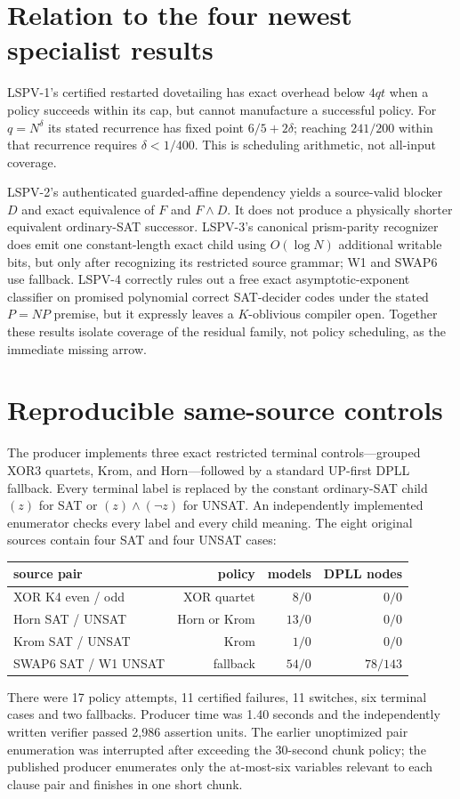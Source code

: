 \documentclass[11pt]{article}
\begin{document}
\section{Relation to the four newest specialist results}
LSPV-1's certified restarted dovetailing has exact overhead below $4qt$ when a
policy succeeds within its cap, but cannot manufacture a successful policy.
For $q=N^\delta$ its stated recurrence has fixed point
$6/5+2\delta$; reaching $241/200$ within that recurrence requires
$\delta<1/400$.  This is scheduling arithmetic, not all-input coverage.

LSPV-2's authenticated guarded-affine dependency yields a source-valid blocker
$D$ and exact equivalence of $F$ and $F\wedge D$.  It does not produce a
physically shorter equivalent ordinary-SAT successor.  LSPV-3's canonical
prism-parity recognizer does emit one constant-length exact child using
$O(\log N)$ additional writable bits, but only after recognizing its restricted
source grammar; W1 and SWAP6 use fallback.  LSPV-4 correctly rules out a free
exact asymptotic-exponent classifier on promised polynomial correct SAT-decider
codes under the stated $P=NP$ premise, but it expressly leaves a $K$-oblivious
compiler open.  Together these results isolate coverage of the residual family,
not policy scheduling, as the immediate missing arrow.

\section{Reproducible same-source controls}
The producer implements three exact restricted terminal controls---grouped XOR3
quartets, Krom, and Horn---followed by a standard UP-first DPLL fallback.  Every
terminal label is replaced by the constant ordinary-SAT child $(z)$ for SAT or
$(z)\wedge(\neg z)$ for UNSAT.  An independently implemented enumerator checks
every label and every child meaning.  The eight original sources contain four
SAT and four UNSAT cases:
\begin{center}
\begin{tabular}{lrrr}
\toprule
source pair & policy & models & DPLL nodes\\
\midrule
XOR K4 even / odd & XOR quartet & $8/0$ & $0/0$\\
Horn SAT / UNSAT & Horn or Krom & $13/0$ & $0/0$\\
Krom SAT / UNSAT & Krom & $1/0$ & $0/0$\\
SWAP6 SAT / W1 UNSAT & fallback & $54/0$ & $78/143$\\
\bottomrule
\end{tabular}
\end{center}
There were 17 policy attempts, 11 certified failures, 11 switches, six terminal
cases and two fallbacks.  Producer time was 1.40 seconds and the independently
written verifier passed 2,986 assertion units.  The earlier unoptimized pair
enumeration was interrupted after exceeding the 30-second chunk policy; the
published producer enumerates only the at-most-six variables relevant to each
clause pair and finishes in one short chunk.
\end{document}
